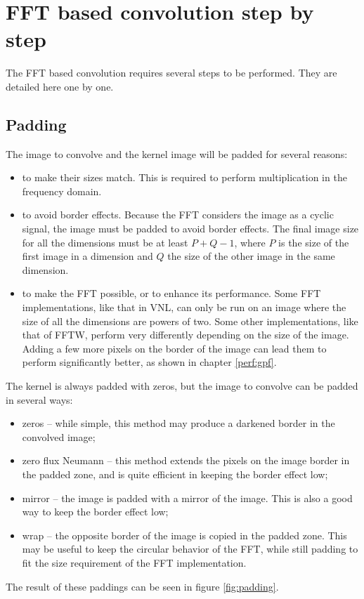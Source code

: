 \documentclass{InsightArticle}
\begin{document}
\section{FFT based convolution step by step}

The FFT based convolution requires several steps to be performed. They are detailed here one by one.

\subsection{Padding}

The image to convolve and the kernel image will be padded for several reasons:
\begin{itemize}
  \item to make their sizes match. This is required to perform multiplication in the frequency
  domain.
  \item  to avoid border effects. Because the FFT considers the image as a cyclic signal, the
  image must be padded to avoid border effects. The final image size for all the dimensions
  must be at least $P+Q-1$, where $P$ is the size of the first image in a dimension and $Q$ the size
  of the other image in the same dimension.
  \item to make the FFT possible, or to enhance its performance. Some FFT implementations, like that in
  VNL, can only be run on an image where the size of all the dimensions are powers of two.
  Some other implementations, like that of FFTW, perform very differently depending on the
  size of the image. Adding a few more pixels on the border of the image can lead them to perform
  significantly better, as shown in chapter \ref{perf:gpf}.
\end{itemize}

The kernel is always padded with zeros, but the image to convolve can be padded in several ways:
\begin{itemize}
 \item zeros -- while simple, this method may produce a darkened border in the convolved image;
 \item zero flux Neumann -- this method extends the pixels on the image border in the padded zone, and
       is quite efficient in keeping the border effect low;
 \item mirror -- the image is padded with a mirror of the image. This is also a good way to
       keep the border effect low;
 \item wrap -- the opposite border of the image is copied in the padded zone. This may be useful to
       keep the circular behavior of the FFT, while still padding to fit the size requirement of the
       FFT implementation.
\end{itemize}
The result of these paddings can be seen in figure \ref{fig:padding}.
\end{document}

